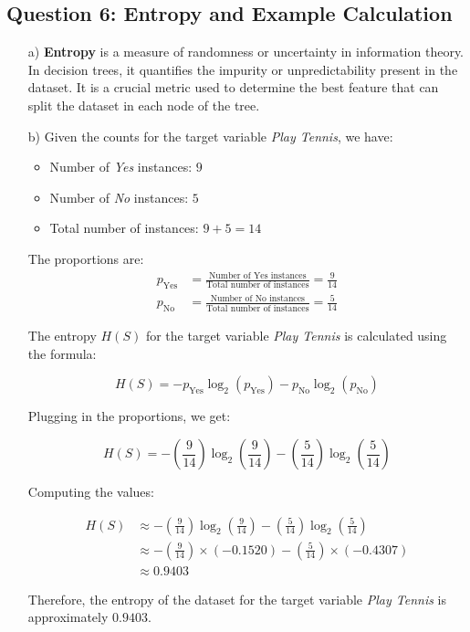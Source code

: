 \documentclass{article}
\begin{document}
\subsection*{Question 6: Entropy and Example Calculation}
\begin{enumerate}
    \item[a)] \textbf{Entropy} is a measure of randomness or uncertainty in information theory. In decision trees, it quantifies the impurity or unpredictability present in the dataset. It is a crucial metric used to determine the best feature that can split the dataset in each node of the tree.
    
    \item[b)]
    Given the counts for the target variable \textit{Play Tennis}, we have:
    \begin{itemize}
        \item Number of \textit{Yes} instances: $9$
        \item Number of \textit{No} instances: $5$
        \item Total number of instances: $9 + 5 = 14$
    \end{itemize}
    
    The proportions are:
    \begin{align*}
        p_{\text{Yes}} &= \frac{\text{Number of Yes instances}}{\text{Total number of instances}} = \frac{9}{14} \\
        p_{\text{No}} &= \frac{\text{Number of No instances}}{\text{Total number of instances}} = \frac{5}{14}
    \end{align*}
    
    The entropy \( H(S) \) for the target variable \textit{Play Tennis} is calculated using the formula:
    
    \[
    H(S) = -p_{\text{Yes}} \log_2(p_{\text{Yes}}) - p_{\text{No}} \log_2(p_{\text{No}})
    \]
    
    Plugging in the proportions, we get:
    
    \[
    H(S) = -\left(\frac{9}{14}\right) \log_2\left(\frac{9}{14}\right) - \left(\frac{5}{14}\right) \log_2\left(\frac{5}{14}\right)
    \]
    
    Computing the values:
    
    \begin{align*}
        H(S) &\approx -\left(\frac{9}{14}\right) \log_2\left(\frac{9}{14}\right) - \left(\frac{5}{14}\right) \log_2\left(\frac{5}{14}\right) \\
        &\approx -\left(\frac{9}{14}\right) \times (-0.1520) - \left(\frac{5}{14}\right) \times (-0.4307) \\
        &\approx 0.9403
    \end{align*}
    
    Therefore, the entropy of the dataset for the target variable \textit{Play Tennis} is approximately $0.9403$.
\end{enumerate}
\end{document}
